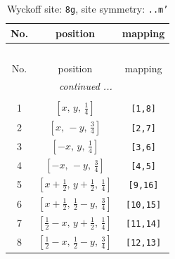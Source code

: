 \documentclass[fleqn,8pt]{jsarticle}
\begin{document}
\begin{longtable}{ccc}
\caption{Wyckoff site: {\tt 8g}, site symmetry: {\tt ..m'}}
 \\
 \hline \hline
No. & position & mapping \\ \hline \endfirsthead

\multicolumn{2}{l}{\tablename\ \thetable{}} \\
 \hline \hline
No. & position & mapping \\ \hline \endhead

 \hline \hline
\multicolumn{2}{r}{\footnotesize\it continued ...} \\ \endfoot

 \hline \hline
\multicolumn{2}{r}{} \\ \endlastfoot

1 & $\left[ x,\, y,\, \frac{1}{4} \right]$ & {\tt [1,8]} \\ \hline
2 & $\left[ x,\, - y,\, \frac{3}{4} \right]$ & {\tt [2,7]} \\ \hline
3 & $\left[ - x,\, y,\, \frac{1}{4} \right]$ & {\tt [3,6]} \\ \hline
4 & $\left[ - x,\, - y,\, \frac{3}{4} \right]$ & {\tt [4,5]} \\ \hline
5 & $\left[ x + \frac{1}{2},\, y + \frac{1}{2},\, \frac{1}{4} \right]$ & {\tt [9,16]} \\ \hline
6 & $\left[ x + \frac{1}{2},\, \frac{1}{2} - y,\, \frac{3}{4} \right]$ & {\tt [10,15]} \\ \hline
7 & $\left[ \frac{1}{2} - x,\, y + \frac{1}{2},\, \frac{1}{4} \right]$ & {\tt [11,14]} \\ \hline
8 & $\left[ \frac{1}{2} - x,\, \frac{1}{2} - y,\, \frac{3}{4} \right]$ & {\tt [12,13]} \\
\end{longtable}
\renewcommand{\arraystretch}{1.2}
\end{document}
